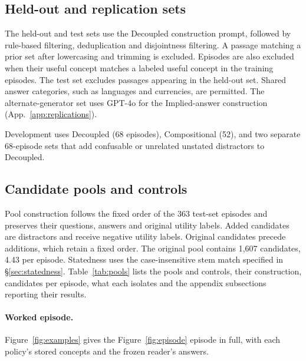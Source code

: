 \subsection{Held-out and replication sets}
\label{app:fresh}

The held-out and test sets use the Decoupled construction prompt, followed by rule-based filtering, deduplication and disjointness filtering. A passage matching a prior set after lowercasing and trimming is excluded. Episodes are also excluded when their useful concept matches a labeled useful concept in the training episodes. The test set excludes passages appearing in the held-out set. Shared answer categories, such as languages and currencies, are permitted. The alternate-generator set uses GPT-4o for the Implied-answer construction (App.~\ref{app:replications}).

Development uses Decoupled (68 episodes), Compositional (52), and two separate 68-episode sets that add confusable or unrelated unstated distractors to Decoupled.


\subsection{Candidate pools and controls}
\label{app:pools}
\label{app:controls}

Pool construction follows the fixed order of the 363 test-set episodes and preserves their questions, answers and original utility labels. Added candidates are distractors and receive negative utility labels. Original candidates precede additions, which retain a fixed order. The original pool contains 1,607 candidates, 4.43 per episode. Statedness uses the case-insensitive stem match specified in \S\ref{sec:statedness}. Table~\ref{tab:pools} lists the pools and controls, their construction, candidates per episode, what each isolates and the appendix subsections reporting their results.

\paragraph{Worked episode.}
Figure~\ref{fig:examples} gives the Figure~\ref{fig:episode} episode in full, with each policy's stored concepts and the frozen reader's answers.


